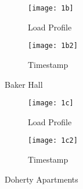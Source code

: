 \documentclass[a4paper,11pt]{article}
\begin{document}
\begin{itemize}
\begin{figure}[H]
        \centering
        \begin{subfigure}[b]{0.3\textwidth}
                \texttt{[image: 1b]}
                \caption{Load Profile }
                \label{fig:Load 1}
        \end{subfigure}%
\hfill
        \begin{subfigure}[b]{0.3\textwidth}
                \texttt{[image: 1b2]}
                \caption{Timestamp}
                \label{fig:tiger}
        \end{subfigure}
        \caption{Baker Hall}\label{fig:animals}
\end{figure}

\begin{figure}[H]
        \centering
        \begin{subfigure}[b]{0.4\textwidth}
                \texttt{[image: 1c]}
                \caption{Load Profile }
                \label{fig:Load 1}
        \end{subfigure}%
\hfill
        \begin{subfigure}[b]{0.3\textwidth}
                \texttt{[image: 1c2]}
                \caption{Timestamp}
                \label{fig:tiger}
        \end{subfigure}
        \caption{Doherty Apartments}\label{fig:animals}
\end{figure}
\end{itemize}
\end{document}

